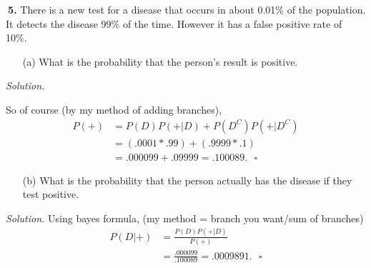\documentclass[12pt]{report}
\begin{document}
\noindent {} $~$\textbf{5.} There is a new test for a disease that occurs in about 0.01\% of the population. It detects the disease 99\% of the time. However it has a false positive rate of 10\%. 
\begin{itemize}
\item [(a)] What is the probability that the person's result is positive.		%
\end{itemize}
\textit{Solution. }\\
\begin{center}
\end{center}
\noindent So of course (by my method of adding branches), 
\begin{align*}
P(+)&=P(D)P(+|D)+P(D^C)P(+|D^C)\\
&=(.0001*.99)+(.9999*.1)\\
&=.000099+.09999=.100089.~~~\square
\end{align*}

\begin{itemize}
\item [(b)] What is the probability that the person actually has the disease if they test positive.		%
\end{itemize}
\textit{Solution. }
Using bayes formula, (my method = branch you want/sum of branches)
\begin{align*}
P(D|+)&=\frac{P(D)P(+|D)}{P(+)}\\
&=\frac{.000099}{.100089}=.0009891.~~~\square
\end{align*}
\end{document}
